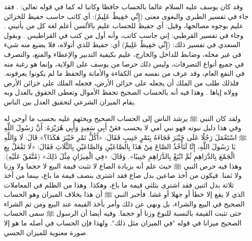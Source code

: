 وقد كان يوسف عليه السلام عالما بالحساب حافظا وكاتبا له كما في قوله تعالى: \quranayah*[12][55]{\footnotesize \surahname*[12]}. فقد جاء في تفسير الطبري والبغوى معنى (إِنِّي حَفِيظٌ عَلِيمٌ): أي كاتب حاسب حفيظ للخزائن عليم بوجوه مصالحها، وقيل: أي حفيظ للحساب عليم بالألسن أعلم لغة كل من يأتيني \cite{tafsir_Tabari}\cite{tafsir_Baghawi}. وجاء في تفسير القرطبي: إني حاسب كاتب، وأنه أول من كتب في القراطيس \cite{tafsir_Qurtubi}. ويقول السعدي في تفسير ذلك: (إِنِّي حَفِيظٌ عَلِيمٌ) أي: حفيظ للذي أتولاه، فلا يضيع منه شيء في غير محله، وضابط للداخل والخارج، عليم بكيفية التدبير والإعطاء والمنع، والتصرف في جميع أنواع التصرفات، وليس ذلك حرصا من يوسف على الولاية، وإنما هو رغبة منه في النفع العام، وقد عرف من نفسه من الكفاءة والأمانة والحفظ ما لم يكونوا يعرفونه. فلذلك طلب من الملك أن يجعله على خزائن الأرض، فجعله الملك على خزائن الأرض وولاه إياها \href{https://shamela.ws/book/42/841#p5}{\faExternalLink} \cite{tafsir_Saadi}. وهذا فيه أنه بالحساب الصحيح تحفظ الأموال وتعطى الحقوق بالعدل وبه يقام الميزان الشرعي لتحقيق العدل بين الناس.

ولقد كان النبي ﷺ يرشد الناس إلى الحساب الصحيح ويحثهم عليه بحسب ما أوحي له وفي هذا دليل نبوته فهو نبي أمي لا يحسب فعَنْ أَبِي سَعِيدٍ وَأَبِي هُرَيْرَةَ: أَنَّ رَسُولَ اللَّهِ ﷺ اسْتَعْمَلَ رَجُلًا عَلَى خَيْبَرَ فَجَاءَهُ بِتَمْرٍ جَنِيبٍ فَقَالَ: «أَكُلُّ تَمْرِ خَيْبَرَ هَكَذَا؟» قَالَ: لَا وَاللَّهِ يَا رَسُولَ اللَّهِ، إِنَّا لَنَأْخُذُ الصَّاعَ مِنْ هَذَا بِالصَّاعَيْنِ وَالصَّاعَيْنِ بِالثَّلَاثِ فَقَالَ: «لَا تَفْعَلْ بِعِ الْجَمْعَ بِالدَّرَاهِمِ ثُمَّ ابْتَعْ بِالدَّرَاهِمِ جَنِيبًا». وَقَالَ: «فِي الْمِيزَانِ مِثْلَ ذَلِكَ» {\footnotesize (مُتَّفَقٌ عَلَيْهِ)}.
وهذا فيه حرص النبي ﷺ حيث علم أنه بزيادة الصاع لا تثبت قيمة البيع لا حجما ولا وزنا ولا ثمنا. فيكون من أخذ صاعين بدل صاع فقد اشترى بنصف قيمة ما باع، بينما من أخذ ثلاثة بدل اثنين فقد اشترى بثلثي قيمة ما باع، وهكذا. وهذا من الظلم في المعاملات الذي لا يقع إلا خطأ أو جهلا أو غشا. فأخبر النبي ﷺ أن هذا بخلاف الميزان وهو الحساب الصحيح في البيع والشراء، بل ونهى عن ذلك وأمر بأخذ القيمة عند البيع ومن ثم الشراء حتى تثبت القيمة بالنسبة للنوع وزنا أو حجما. وفيه أيضا أن الرسول ﷺ سمى الحساب الصحيح ميزانا في قوله "في الميزان مثل ذلك". ولهذا فإن الحساب في أصله ما هو إلا صورة معنوية للميزان الحسي.

